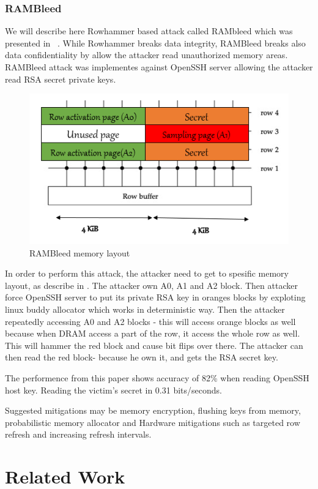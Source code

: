 \subsubsection{RAMBleed}
We will describe here Rowhammer based attack called RAMbleed which was presented in ~\cite{rambleed_paper}. While Rowhammer breaks data integrity, RAMBleed breaks also data confidentiality by allow the attacker read unauthorized memory areas. RAMBleed attack was implementes against OpenSSH server allowing the attacker read RSA secret private keys. 

\begin{figure}[!ht]
	\centering
	\includegraphics[width=0.7\linewidth]{images/chapter_9/rambleed_memory_layout.png}
	\caption{RAMBleed memory layout}
	\label{fig:rambleed_memory_layout}
\end{figure}
In order to perform this attack, the attacker need to get to spesific memory layout, as describe in . The attacker own A0, A1 and A2 block. Then attacker force OpenSSH server to put its private RSA key in oranges blocks by exploting linux buddy allocator which works in deterministic way. Then the attacker repeatedly accessing A0 and A2 blocks - this will access orange blocks 
as well because when DRAM access a part of the row, it access the whole row as well. This will hammer the red block and cause bit flips over there. The attacker can then read the red block- because he own it, and gets the RSA secret key.

The performence from this paper shows accuracy of 82\% when reading OpenSSH host key. Reading the victim’s secret in 0.31 bits/seconds.

Suggested mitigations may be memory encryption, flushing keys from memory, probabilistic memory allocator and Hardware mitigations such as targeted row refresh and increasing refresh intervals.



\section{Related Work} \label{sec:RelatedWork}

